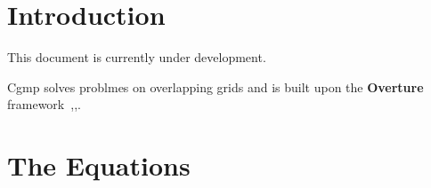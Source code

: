 \documentclass[11pt]{article}
\newcommand{\Overture}{{\bf Over\-ture\ }}
\begin{document}
\clearpage
\tableofcontents
\listoffigures

\vfill\eject


\section{Introduction}

This document is currently under development. 


Cgmp solves problmes on overlapping grids and is built upon the \Overture 
framework~\cite{Brown97},\cite{Henshaw96a},\cite{iscope97}. 



\section{The Equations}


\clearpage



\clearpage



\clearpage



\vfill\eject




\printindex
\end{document}
